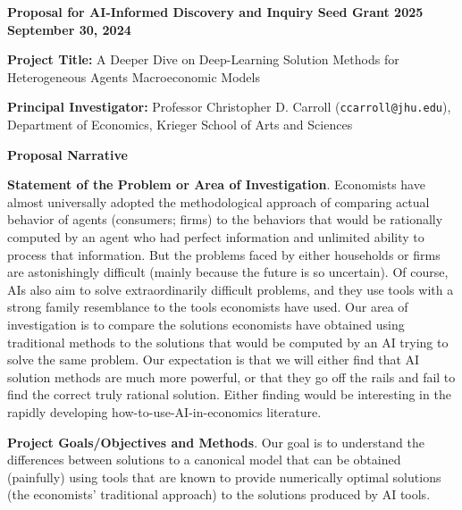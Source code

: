 \documentclass[11pt,pdftex,letterpaper]{article}
\begin{document}
\thispagestyle{empty}

\begin{center}
	\textbf{Proposal for AI-Informed Discovery and Inquiry Seed Grant 2025 \\ September 30, 2024}
\end{center}

\vspace{1.5cm}

\noindent \textbf{Project Title:} A Deeper Dive on Deep-Learning Solution Methods for Heterogeneous Agents Macroeconomic Models

\vspace{1.5cm}

\noindent \textbf{Principal Investigator:} Professor Christopher D. Carroll (\texttt{ccarroll@jhu.edu}), Department of Economics, Krieger School of Arts and Sciences

\newpage
\setcounter{page}{1}

\begin{center}
	\textbf{Proposal Narrative}
      \end{center}

      \textbf{Statement of the Problem or Area of Investigation}. Economists have almost universally adopted the methodological approach of comparing actual behavior of agents (consumers; firms) to the behaviors that would be rationally computed by an agent who had perfect information and unlimited ability to process that information. But the problems faced by either households or firms are astonishingly difficult (mainly because the future is so uncertain). Of course, AIs also aim to solve extraordinarily difficult problems, and they use tools with a strong family resemblance to the tools economists have used. Our area of investigation is to compare the solutions economists have obtained using traditional methods to the solutions that would be computed by an AI trying to solve the same problem. Our expectation is that we will either find that AI solution methods are much more powerful, or that they go off the rails and fail to find the correct truly rational solution. Either finding would be interesting in the rapidly developing how-to-use-AI-in-economics literature.

      \textbf{Project Goals/Objectives and Methods}.  Our goal is to understand the differences between solutions to a canonical model that can be obtained (painfully) using tools that are known to provide numerically optimal solutions (the economists' traditional approach) to the solutions produced by AI tools.  
\end{document}
